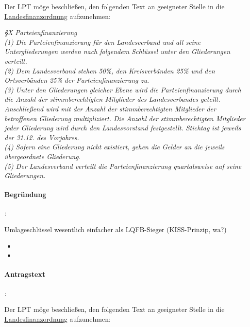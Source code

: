 Der LPT möge beschließen, den folgenden Text an geeigneter Stelle in die \href{http://wiki.piratenpartei.de/LSA:Satzung#Abschnitt_B:_Finanzordnung}{Landesfinanzordnung} aufzunehmen:

\textit{§X Parteienfinanzierung\\
(1) Die Parteienfinanzierung für den Landesverband und all seine Untergliederungen werden nach folgendem Schlüssel unter den Gliederungen verteilt.\\
(2) Dem Landesverband stehen 50\%, den Kreisverbänden 25\% und den Ortsverbänden 25\% der Parteienfinanzierung zu.\\
(3) Unter den Gliederungen gleicher Ebene wird die Parteienfinanzierung durch die Anzahl der stimmberechtigten Mitglieder des Landesverbandes geteilt. Anschließend wird mit der Anzahl der stimmberechtigten Mitglieder der betroffenen Gliederung multipliziert. Die Anzahl der stimmberechtigten Mitglieder jeder Gliederung wird durch den Landesvorstand festgestellt. Stichtag ist jeweils der 31.12. des Vorjahres.\\
(4) Sofern eine Gliederung nicht existiert, gehen die Gelder an die jeweils übergeordnete Gliederung.\\
(5) Der Landesverband verteilt die Parteienfinanzierung quartalsweise auf seine Gliederungen.}

\paragraph{Begründung}:

Umlageschlüssel wesentlich einfacher als LQFB-Sieger (KISS-Prinzip, wa?)


\label{satzung:partfin3}
\begin{itemize}
\item {}
\item {}
\end{itemize}

\paragraph{Antragstext}:

Der LPT möge beschließen, den folgenden Text an geeigneter Stelle in die \href{http://wiki.piratenpartei.de/LSA:Satzung#Abschnitt_B:_Finanzordnung}{Landesfinanzordnung} aufzunehmen:

